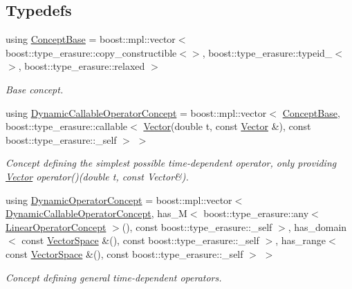 \subsection*{Typedefs}
\begin{DoxyCompactItemize}
\item 
using \hyperlink{group__ConceptGroup_ga63426675cc05ccce03ead56a4fa90d96_ga63426675cc05ccce03ead56a4fa90d96}{Concept\+Base} = boost\+::mpl\+::vector$<$ boost\+::type\+\_\+erasure\+::copy\+\_\+constructible$<$$>$, boost\+::type\+\_\+erasure\+::typeid\+\_\+$<$$>$, boost\+::type\+\_\+erasure\+::relaxed $>$
\begin{DoxyCompactList}\small\item\em Base concept. \end{DoxyCompactList}\item 
using \hyperlink{group__ConceptGroup_ga30692db093ead5a1a074905363a2f043_ga30692db093ead5a1a074905363a2f043}{Dynamic\+Callable\+Operator\+Concept} = boost\+::mpl\+::vector$<$ \hyperlink{group__ConceptGroup_ga63426675cc05ccce03ead56a4fa90d96_ga63426675cc05ccce03ead56a4fa90d96}{Concept\+Base}, boost\+::type\+\_\+erasure\+::callable$<$ \hyperlink{classSpacy_1_1Vector}{Vector}(double t, const \hyperlink{classSpacy_1_1Vector}{Vector} \&), const boost\+::type\+\_\+erasure\+::\+\_\+self $>$ $>$
\begin{DoxyCompactList}\small\item\em Concept defining the simplest possible time-\/dependent operator, only providing \hyperlink{classSpacy_1_1Vector}{Vector} operator()(double t, const Vector\&). \end{DoxyCompactList}\item 
using \hyperlink{group__ConceptGroup_ga2c979d268f0ca7a436776a9631d10af7_ga2c979d268f0ca7a436776a9631d10af7}{Dynamic\+Operator\+Concept} = boost\+::mpl\+::vector$<$ \hyperlink{group__ConceptGroup_ga30692db093ead5a1a074905363a2f043_ga30692db093ead5a1a074905363a2f043}{Dynamic\+Callable\+Operator\+Concept}, has\+\_\+\+M$<$ boost\+::type\+\_\+erasure\+::any$<$ \hyperlink{group__ConceptGroup_gaf0e18e41c434cfceb77ccb8e785a8055_gaf0e18e41c434cfceb77ccb8e785a8055}{Linear\+Operator\+Concept} $>$(), const boost\+::type\+\_\+erasure\+::\+\_\+self $>$, has\+\_\+domain$<$ const \hyperlink{classSpacy_1_1VectorSpace}{Vector\+Space} \&(), const boost\+::type\+\_\+erasure\+::\+\_\+self $>$, has\+\_\+range$<$ const \hyperlink{classSpacy_1_1VectorSpace}{Vector\+Space} \&(), const boost\+::type\+\_\+erasure\+::\+\_\+self $>$ $>$
\begin{DoxyCompactList}\small\item\em Concept defining general time-\/dependent operators. \end{DoxyCompactList}\item 

\end{DoxyCompactItemize}
